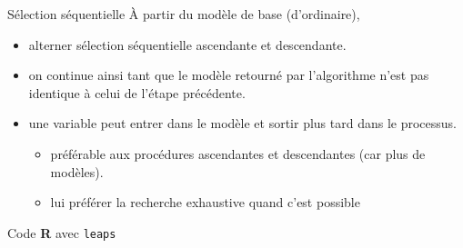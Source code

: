 \documentclass[
  ignorenonframetext,
]{beamer}
\newenvironment{Shaded}{\begin{snugshade}}{\end{snugshade}}
\newcommand{\AttributeTok}[1]{\textcolor[rgb]{0.40,0.45,0.13}{#1}}
\newcommand{\CommentTok}[1]{\textcolor[rgb]{0.37,0.37,0.37}{#1}}
\newcommand{\FunctionTok}[1]{\textcolor[rgb]{0.28,0.35,0.67}{#1}}
\newcommand{\NormalTok}[1]{\textcolor[rgb]{0.00,0.23,0.31}{#1}}
\newcommand{\OtherTok}[1]{\textcolor[rgb]{0.00,0.23,0.31}{#1}}
\newcommand{\SpecialCharTok}[1]{\textcolor[rgb]{0.37,0.37,0.37}{#1}}
\newcommand{\StringTok}[1]{\textcolor[rgb]{0.13,0.47,0.30}{#1}}
\providecommand{\tightlist}{%
  \setlength{\itemsep}{0pt}\setlength{\parskip}{0pt}}\usepackage{longtable,booktabs,array}
\begin{document}
\begin{frame}{Sélection séquentielle}
\protect\hypertarget{suxe9lection-suxe9quentielle}{}
À partir du modèle de base (d'ordinaire),

\begin{itemize}
\tightlist
\item
  alterner sélection séquentielle ascendante et descendante.
\item
  on continue ainsi tant que le modèle retourné par l'algorithme n'est
  pas identique à celui de l'étape précédente.
\item
  une variable peut entrer dans le modèle et sortir plus tard dans le
  processus.

  \begin{itemize}
  \tightlist
  \item
    préférable aux procédures ascendantes et descendantes (car plus de
    modèles).
  \item
    lui préférer la recherche exhaustive quand c'est possible
  \end{itemize}
\end{itemize}
\end{frame}

\begin{frame}[fragile]{Code \textbf{R} avec \texttt{leaps}}
\protect\hypertarget{code-r-avec-leaps}{}
\begin{Shaded}
\end{Shaded}
\end{frame}
\end{document}
